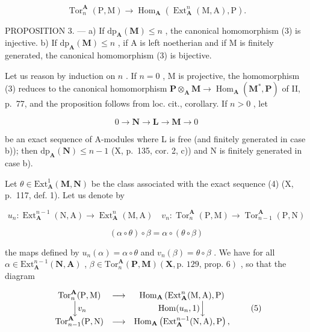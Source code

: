 \[
\operatorname{Tor} _ {n} ^ {\mathbf {A}} (\mathrm{P}, \mathrm{M}) \rightarrow \operatorname{Hom} _ {\mathbf {A}} \left(\operatorname{Ext} _ {\mathbf {A}} ^ {n} (\mathrm{M}, \mathrm{A}), \mathrm{P}\right).\tag{3}
\]

PROPOSITION 3. --- a) If \(\mathrm{dp}_{\mathbf{A}}(\mathbf{M}) \leqslant n\) , the canonical homomorphism (3) is injective. b) If \(\mathrm{dp}_{\mathbf{A}}(\mathbf{M}) \leqslant n\) , if A is left noetherian and if M is finitely generated, the canonical homomorphism (3) is bijective.

Let us reason by induction on \(n\) . If \(n = 0\) , M is projective, the homomorphism (3) reduces to the canonical homomorphism \(\mathbf{P} \otimes_{\mathbf{A}} \mathbf{M} \to \operatorname{Hom}_{\mathbf{A}} (\mathbf{M}^{*}, \mathbf{P})\) of II, p.~77, and the proposition follows from loc. cit., corollary. If \(n > 0\) , let

\[
0 \rightarrow \mathbf {N} \rightarrow \mathbf {L} \rightarrow \mathbf {M} \rightarrow 0\tag{4}
\]

be an exact sequence of A-modules where L is free (and finitely generated in case b)); then \(\mathrm{dp}_{\mathbf{A}}(\mathbf{N}) \leqslant n - 1\) (X, p.~135, cor. 2, c)) and N is finitely generated in case b).

Let \(\theta\in\mathrm{Ext}_{\mathbf{A}}^{1}(\mathbf{M},\mathbf{N})\) be the class associated with the exact sequence (4) (X, p.~117, def. 1). Let us denote by

\[
u _ {n}: \operatorname{Ext} _ {\mathbf {A}} ^ {n - 1} (\mathrm{N}, \mathrm{A}) \rightarrow \operatorname{Ext} _ {\mathbf {A}} ^ {n} (\mathrm{M}, \mathrm{A}) \quad v _ {n}: \operatorname{Tor} _ {n} ^ {\mathbf {A}} (\mathrm{P}, \mathrm{M}) \rightarrow \operatorname{Tor} _ {n - 1} ^ {\mathbf {A}} (\mathrm{P}, \mathrm{N})
\]

\[
(\alpha \circ \theta) \circ \beta = \alpha \circ (\theta \circ \beta)
\]

the maps defined by \(u_{n}(\alpha) = \alpha \circ \theta\) and \(v_{n}(\beta) = \theta \circ \beta\) . We have for all \(\alpha\in\mathrm{Ext}_{\mathbf{A}}^{n-1}\left(\mathbf{N},\mathbf{A}\right)\) , \(\beta\in\mathrm{Tor}_{n}^{\mathbf{A}}\left(\mathbf{P},\mathbf{M}\right)\left(\mathbf{X},\text{p. 129, prop. 6}\right)\) , so that the diagram

\[
\begin{array}{c c c} \operatorname{Tor} _ {n} ^ {\mathbf {A}} (\mathrm{P}, \mathrm{M}) & \longrightarrow & \operatorname{Hom} _ {\mathbf {A}} \left(\operatorname{Ext} _ {\mathbf {A}} ^ {n} (\mathrm{M}, \mathrm{A}), \mathrm{P}\right) \\ \Big \downarrow v _ {n} & & \operatorname{Hom} (u _ {n}, 1) \Big \downarrow \\ \operatorname{Tor} _ {n - 1} ^ {\mathbf {A}} (\mathrm{P}, \mathrm{N}) & \longrightarrow & \operatorname{Hom} _ {\mathbf {A}} \left(\operatorname{Ext} _ {\mathbf {A}} ^ {n - 1} (\mathrm{N}, \mathrm{A}), \mathrm{P}\right), \end{array}\tag{5}
\]

